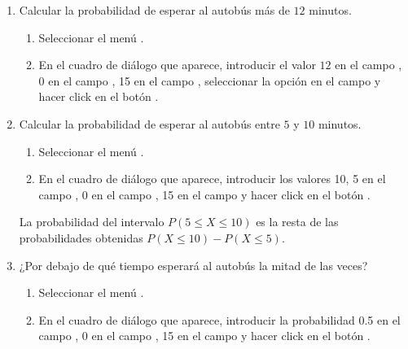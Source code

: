 \begin{enumerate}[leftmargin=*]
\begin{enumerate}
\item Calcular la probabilidad de esperar al autobús más de $12$ minutos.
\begin{indicacion}{
\begin{enumerate}
\item Seleccionar el menú .
\item En el cuadro de diálogo que aparece, introducir el valor $12$ en el campo , 0 en el
campo , 15 en el campo , seleccionar la opción  en el campo  y hacer click en el
botón .
\end{enumerate}}
\end{indicacion}

\item Calcular la probabilidad de esperar al autobús entre $5$ y $10$ minutos.
\begin{indicacion}{
\begin{enumerate}
\item Seleccionar el menú .
\item En el cuadro de diálogo que aparece, introducir los valores 10, 5 en el campo , 0 en el campo
, 15 en el campo  y hacer click en el botón .
\end{enumerate}
La probabilidad del intervalo $P(5\leq X\leq 10)$ es la resta de las probabilidades obtenidas $P(X\leq 10)-P(X\leq 5)$.
}
\end{indicacion}

\item ¿Por debajo de qué tiempo esperará al autobús la mitad de las veces?
\begin{indicacion}{
\begin{enumerate}
\item Seleccionar el menú .
\item En el cuadro de diálogo que aparece, introducir la probabilidad 0.5 en el campo ,
0 en el campo , 15 en el campo  y hacer click en el botón .
\end{enumerate}}
\end{indicacion}


\end{enumerate}
\end{enumerate}
